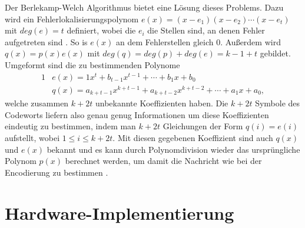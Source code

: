 Der Berlekamp-Welch Algorithmus bietet eine Lösung dieses Problems. 
Dazu wird ein Fehlerlokalisierungspolynom $e(x)=(x-e_1)(x-e_2)\cdots(x-e_t)$ mit $deg(e)=t$ definiert, wobei die $e_i$ die Stellen sind, an denen Fehler aufgetreten sind \cite{weitzKonkreteMathematikNicht2021}.
So is $e(x)$ an dem Fehlerstellen gleich 0.
Außerdem wird $q(x)=p(x)e(x)$ mit $deg(q)=deg(p)+deg(e)=k-1+t$ gebildet.
Umgeformt sind die zu bestimmenden Polynome
\begin{alignat}{1}
	&e(x)=1x^t+b_{t-1}x^{t-1}+\cdots+b_1x+b_0\nonumber\\
	&q(x)=a_{k+t-1}x^{k+t-1}+a_{k+t-2}x^{k+t-2}+\cdots+a_1x+a_0,\nonumber
\end{alignat}
welche zusammen $k+2t$ unbekannte Koeffizienten haben.
Die $k+2t$ Symbole des Codeworts liefern also genau genug Informationen um diese Koeffizienten eindeutig zu bestimmen, indem man $k+2t$ Gleichungen der Form $q(i)=e(i)$ aufstellt, wobei $1\leq i\leq k+2t$.
Mit diesen gegebenen Koeffizient sind auch $q(x)$ und $e(x)$ bekannt und es kann durch Polynomdivision wieder das ursprüngliche Polynom $p(x)$ berechnet werden, um damit die Nachricht wie bei der Encodierung zu bestimmen \cite{fengBerlekampWelchAlgorithmGuide}.

\section{Hardware-Implementierung}\label{sec:hardware}


